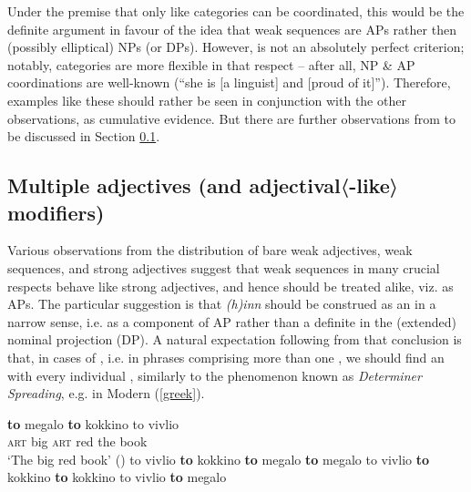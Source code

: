 \documentclass[output=paper,colorlinks,citecolor=brown]{langscibook}
\begin{document}
Under the premise that only like categories can be coordinated, this would be the definite argument in favour of the idea that weak sequences are APs rather then (possibly elliptical) NPs (or DPs). However,  is not an absolutely perfect criterion; notably,  categories are more flexible in that respect -- after all,   NP \& AP coordinations are well-known (``she is [a linguist] and [proud of it]''). Therefore, examples like these should rather be seen in conjunction with the other observations, as cumulative evidence. But there are further observations from  to be discussed in Section \ref{subsect:multadj}.




\subsection{Multiple adjectives (and adjectival〈-like〉 modifiers)}
\label{subsect:multadj}

Various observations from the distribution of bare weak adjectives, weak sequences, and strong adjectives  suggest that weak sequences  in many crucial respects behave like strong adjectives, and hence should be treated alike, viz. as APs. The particular suggestion is that \textit{(h)inn} should be construed as an  in a narrow sense, i.e. as a component of AP rather than a definite  in the (extended) nominal projection (DP). A natural expectation following  from that conclusion is that, in cases of , i.e. in  phrases comprising more than one , we should find an  with every individual , similarly to the phenomenon known as \textit{Determiner Spreading}, e.g. in Modern  (\ref{greek}).


\begin{exe}
\ex       \label{greek}
    \begin{xlist}
         \ex\gll \textbf{to}  {megalo}  \textbf{to} {kokkino} to vivlio    \\  
         \textsc{art}  big \textsc{art} red the book  \\
         \glt `The big red book' (\citealt[303]{alexiadouWilder})
         \ex    to   vivlio  \textbf{to} {kokkino}  \textbf{to} {megalo}  
         \ex  \textbf{to} {megalo} to vivlio  \textbf{to} {kokkino}  
         \ex  \textbf{to} {kokkino} to vivlio  \textbf{to} {megalo} 
\end{xlist} 
\end{exe} 
\end{document}
